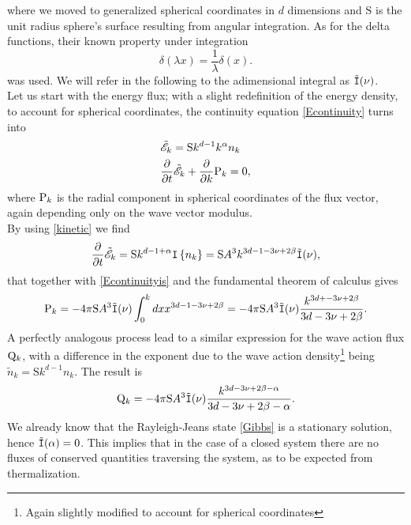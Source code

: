 where we moved to generalized spherical coordinates in $d$ dimensions and $\mathrm{S}$  is the unit radius sphere's surface
resulting from angular integration. 
As for the delta functions, their known property under integration
\begin{equation*}
    \delta(\lambda x) = \frac{1}{\lambda} \delta (x).
\end{equation*}
was used.
We will refer in the following to the adimensional integral as $\tilde{\mathtt{I}}(\nu)$. \\
Let us start with the energy flux; with a slight redefinition of the energy density,
to account for spherical coordinates, the continuity equation \eqref{Econtinuity} turns into 
\begin{align}
    &\tilde{\mathscr{E}}_k = \mathrm{S}k^{d-1}k^\alpha n_k \\
    &\frac{\partial}{\partial t} \tilde{\mathscr{E}}_k + \frac{\partial}{\partial k}  \mathrm{P}_k = 0,
    \label{Econtinuityis}
\end{align}
where $\mathrm{P}_k$ is the radial component in spherical coordinates of the flux vector,
again depending only on the wave vector modulus.\\
By using \eqref{kinetic} we find
\begin{equation}
    \frac{\partial}{\partial t} \tilde{\mathscr{E}}_k = \mathrm{S} k^{d-1+\alpha} \mathtt{I}\left\{n_k\right\}= \mathrm{S} A^3 k^{3d-1-3\nu +2\beta} \tilde{\mathtt{I}}(\nu),
\end{equation}
that together with \eqref{Econtinuityis} and the fundamental theorem of calculus gives 
\begin{equation}
    \mathrm{P}_k = - 4\pi \mathrm{S} A^3 \tilde{\mathtt{I}}(\nu) \int_{0}^{k} dx x^{3d-1-3\nu +2\beta} = - 4\pi \mathrm{S} A^3 \tilde{\mathtt{I}}(\nu) 
    \frac{k^{3d+-3\nu +2\beta}}{3d-3\nu +2\beta}.
    \label{KZP}
\end{equation} 
A perfectly analogous process lead to a similar expression for the wave action flux $\mathrm{Q}_k$, with a difference in the exponent due to the wave action 
density\footnote{Again slightly modified to account for spherical coordinates} being $\tilde{n}_k=\mathrm{S}k^{d-1}n_k$. The result is
\begin{equation}
    \mathrm{Q}_k = - 4\pi \mathrm{S} A^3 \tilde{\mathtt{I}}(\nu) \frac{k^{3d-3\nu +2\beta-\alpha}}{3d-3\nu +2\beta-\alpha}.
    \label{KZQ}
\end{equation}
We already know that the Rayleigh-Jeans state \eqref{Gibbs} is a stationary solution, hence $\tilde{\mathtt{I}}(\alpha) = 0$. This implies that in the case of a closed system there are no
fluxes of conserved quantities traversing the system, as to be expected from thermalization. \\ 

